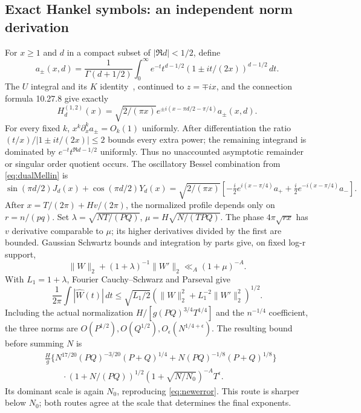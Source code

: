 \documentclass[11pt]{article}
\theoremstyle{remark}
\begin{document}
\subsection{Exact Hankel symbols: an independent norm derivation}
For $x\ge1$ and $d$ in a compact subset of $|\Re d|<1/2$, define
\[
 a_\pm(x,d)=\frac1{\Gamma(d+1/2)}\int_0^\infty
 e^{-t}t^{d-1/2}(1\pm it/(2x))^{d-1/2}\,dt.
\]
The $U$ integral and its $K$ identity~\cite[13.4.4, 13.6.10]{DLMF},
continued to $z=\mp ix$, and the connection formula 10.27.8 give exactly
\[
 H_d^{(1,2)}(x)=\sqrt{2/(\pi x)}
 e^{\pm i(x-\pi d/2-\pi/4)}a_\pm(x,d).
\]
For every fixed $k$, $x^k\partial_x^ka_\pm=O_k(1)$ uniformly.
After differentiation the ratio
$(t/x)/|1\pm it/(2x)|\le2$ bounds every extra power; the remaining
integrand is dominated by $e^{-t}t^{\Re d-1/2}$ uniformly. Thus no
unaccounted asymptotic remainder or singular order quotient occurs.
The oscillatory Bessel combination from \eqref{eq:dualMellin} is
\[
 \sin(\pi d/2)J_d(x)+\cos(\pi d/2)Y_d(x)
 =\sqrt{2/(\pi x)}\left[-\tfrac i2e^{i(x-\pi/4)}a_+
                        +\tfrac i2e^{-i(x-\pi/4)}a_-\right].
\]
After $x=T/(2\pi)+Hv/(2\pi)$, the normalized profile depends only on
$r=n/(pq)$. Set $\lambda=\sqrt{NT/(PQ)}$, $\mu=H\sqrt{N/(TPQ)}$.
The phase $4\pi\sqrt{rx}$ has $v$ derivative comparable to $\mu$;
its higher derivatives divided by the first are bounded. Gaussian
Schwartz bounds and integration by parts give, on fixed log-r support,
\[
 \|W\|_2+(1+\lambda)^{-1}\|W'\|_2\ll_A(1+\mu)^{-A}.
\]
With $L_1=1+\lambda$, Fourier Cauchy--Schwarz and Parseval give
\[
 \frac1{2\pi}\int|\widehat W(t)|\,dt
 \le\sqrt{L_1/2}(\|W\|_2^2+L_1^{-2}\|W'\|_2^2)^{1/2}.
\]
Including the actual normalization
$H/[g(PQ)^{3/4}T^{1/4}]$ and the $n^{-1/4}$ coefficient, the three
norms are $O(P^{1/2}),O(Q^{1/2}),O_\epsilon(N^{1/4+\epsilon})$.
The resulting bound before summing $N$ is
\[
 \begin{aligned}
 &\frac Hg\{N^{17/20}(PQ)^{-3/20}(P+Q)^{1/4}
      +N(PQ)^{-1/8}(P+Q)^{1/8}\}\\
 &\hspace{25pt}\cdot(1+N/(PQ))^{1/2}(1+\sqrt{N/N_0})^{-A}T^\epsilon.
 \end{aligned}
\]
Its dominant scale is again $N_0$, reproducing \eqref{eq:newerror}.
This route is sharper below $N_0$; both routes agree at the scale that
determines the final exponents.
\end{document}
